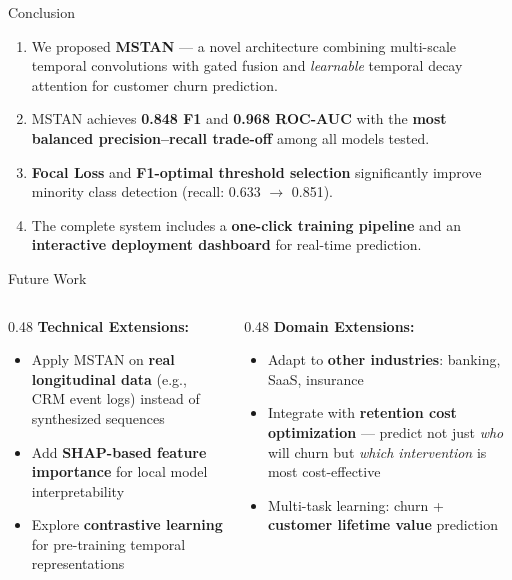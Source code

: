 \documentclass[aspectratio=169,11pt]{beamer}
\begin{document}
\begin{frame}{Conclusion}
\begin{enumerate}
    \item We proposed \textbf{MSTAN} — a novel architecture combining multi-scale temporal convolutions with gated fusion and \emph{learnable} temporal decay attention for customer churn prediction.
    \vspace{4pt}
    \item MSTAN achieves \textbf{0.848 F1} and \textbf{0.968 ROC-AUC} with the \textbf{most balanced precision--recall trade-off} among all models tested.
    \vspace{4pt}
    \item \textbf{Focal Loss} and \textbf{F1-optimal threshold selection} significantly improve minority class detection (recall: 0.633 $\rightarrow$ 0.851).
    \vspace{4pt}
    \item The complete system includes a \textbf{one-click training pipeline} and an \textbf{interactive deployment dashboard} for real-time prediction.
\end{enumerate}
\end{frame}

\begin{frame}{Future Work}
\begin{columns}[T]
\begin{column}{0.48\textwidth}
\textbf{Technical Extensions:}
\begin{itemize}
    \item Apply MSTAN on \textbf{real longitudinal data} (e.g., CRM event logs) instead of synthesized sequences
    \item Add \textbf{SHAP-based feature importance} for local model interpretability
    \item Explore \textbf{contrastive learning} for pre-training temporal representations
\end{itemize}
\end{column}
\begin{column}{0.48\textwidth}
\textbf{Domain Extensions:}
\begin{itemize}
    \item Adapt to \textbf{other industries}: banking, SaaS, insurance
    \item Integrate with \textbf{retention cost optimization} — predict not just \emph{who} will churn but \emph{which intervention} is most cost-effective
    \item Multi-task learning: churn + \textbf{customer lifetime value} prediction
\end{itemize}
\end{column}
\end{columns}
\end{frame}
\end{document}
